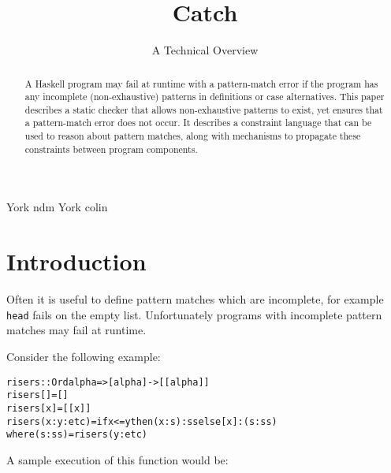 \documentclass[preprint]{sigplanconf}
\newcommand{\T}[1]{\texttt{#1}}
\newenvironment{code}{\begin{alltt}\small}{\end{alltt}}
\begin{document}
\copyrightdata{[to be supplied]}

\titlebanner{\today{} - \currenttime{}}        %

\title{Catch}
\subtitle{A Technical Overview}

           {York}
           {ndm}
           {York}
           {colin}

\maketitle

\begin{abstract}
A Haskell program may fail at runtime with a pattern-match error if the program has any incomplete (non-exhaustive) patterns in definitions or case alternatives. This paper describes a static checker that allows non-exhaustive patterns to exist, yet ensures that a pattern-match error does not occur. It describes a constraint language that can be used to reason about pattern matches, along with mechanisms to propagate these constraints between program components.
\end{abstract}




\section{Introduction}
\label{sec:introduction}

Often it is useful to define pattern matches which are incomplete, for example \T{head} fails on the empty list. Unfortunately programs with incomplete pattern matches may fail at runtime.

Consider the following example:

\begin{code}
risers :: Ord alpha => [alpha] -> [[alpha]]
risers [] = []
risers [x] = [[x]]
risers (x:y:etc) = if x <= y then (x:s):ss else [x]:(s:ss)
    where (s:ss) = risers (y:etc)
\end{code}

A sample execution of this function would be:
\end{document}
